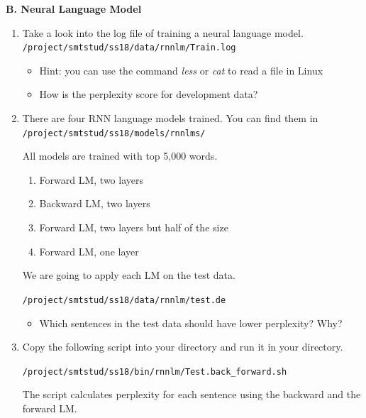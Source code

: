 \documentclass[12pt,fleqn]{article}
\begin{document}
\newpage 

\vspace{0.5cm} 
\textbf{B. Neural Language Model} \\ 

\begin{enumerate} 

\item Take a look into the log file of training a neural language model. \\ 
\texttt{/project/smtstud/ss18/data/rnnlm/Train.log} \\ 
\begin{itemize} 
\item Hint: you can use the command \textit{less} or \textit{cat} to read a file in Linux
\item How is the perplexity score for development data? 
\end{itemize}



\item There are four RNN language models trained. You can find them in \\ 
\texttt{/project/smtstud/ss18/models/rnnlms/} 

All models are trained with top 5,000 words. 
\begin{enumerate} 
 \item Forward LM, two layers 
 \item Backward LM, two layers 
 \item Forward LM, two layers but half of the size  
 \item Forward LM, one layer 
\end{enumerate}

We are going to apply each LM on the test data. 

\texttt{/project/smtstud/ss18/data/rnnlm/test.de} \\ 

\begin{itemize} 
 \item Which sentences in the test data should have lower perplexity? Why? 
\end{itemize}

\newpage 

\item Copy the following script into your directory and run it in your directory. 

\texttt{/project/smtstud/ss18/bin/rnnlm/Test.back\_forward.sh} 

The script calculates perplexity for each sentence using the backward and the forward LM. 


\end{enumerate}
\end{document}
